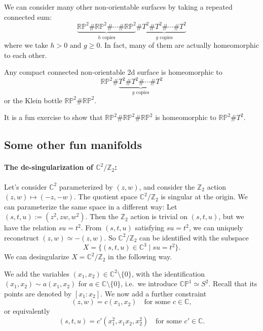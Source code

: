 \documentclass[12pt]{article}
\numberwithin{equation}{section}
\def\bC{\mathbb{C}}
\def\bZ{\mathbb{Z}}
\def\RP{\mathbb{RP}}
\def\CP{\mathbb{CP}}
\begin{document}
We can consider many other non-orientable surfaces by taking a repeated connected sum:
\begin{equation}
  \underbrace{\RP^2\#\RP^2\#\cdots\#\RP^2}_\text{$h$ copies}
  \#
  \underbrace{T^2\# T^2 \#\cdots\# T^2}_\text{$g$ copies}
\end{equation}
where we take $h>0$ and $g\ge 0$.
In fact, many of them are actually homeomorphic to each other.
\begin{fact}
Any compact connected non-orientable 2d surface is homeomorphic to
\begin{equation}
\RP^2 \# \underbrace{T^2\# T^2 \#\cdots\# T^2}_\text{$g$ copies}
\end{equation}
or the Klein bottle $\RP^2\#\RP^2$.
\end{fact}
It is a fun exercise to show that $\RP^2 \# \RP^2 \# \RP^2$ is homeomorphic to $\RP^2 \# T^2$.

\subsection{Some other fun manifolds}


\paragraph{The de-singularization of $\bC^2/\bZ_2$:}
Let's consider $\bC^2$ parameterized by $(z,w)$,
and consider the $\bZ_2$ action $(z,w)\mapsto (-z,-w)$.
The quotient space $\bC^2/\bZ_2$ is singular at the origin.
We can parameterize the same space in a different way:
Let $(s,t,u):=(z^2, z w, w^2)$.
Then the $\bZ_2$ action is trivial on $(s,t,u)$, but we have the relation $su=t^2$.
From $(s,t,u)$ satisfying $su=t^2$, we can uniquely reconstruct $(z,w)\simeq -(z,w)$.
So $\bC^2/\bZ_2$ can be identified with the subspace \begin{equation}
X=\{ (s,t,u)\in \bC^3 \mid su=t^2 \}.
\end{equation}
We can desingularize $X=\bC^2/\bZ_2$ in the following way.

We add the variables $(x_1,x_2)\in \bC^2\setminus \{0\}$, with the identification 
$(x_1,x_2)\sim a(x_1,x_2)$ for $a\in \bC\setminus \{0\}$,
i.e.~we introduce $\CP^1\simeq S^2$.
Recall that its points are denoted by $[x_1:x_2]$.
We now add a further constraint \begin{equation}
(z,w) = c(x_1,x_2) \quad \text{for some $c\in \bC$},
\end{equation} or equivalently \begin{equation}
  (s,t,u)= c'(x_1^2, x_1 x_2, x_2^2) \quad \text{for some $c'\in \bC$}. \label{eq:blowup}
\end{equation}
\end{document}
